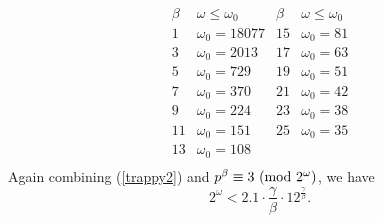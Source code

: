 \documentclass{amsart}
\def\mod#1{{\ifmmode\text{\rm\ (mod~$#1$)}
\else\discretionary{}{}{\hbox{ }}\rm(mod~$#1$)\fi}}
\begin{document}
{$$
\begin{array}{cc|cc}
\beta & \omega \leq \omega_0 & \beta & \omega \leq \omega_0 \\ \hline
1 & \omega_0=18077 & 15 & \omega_0=81 \\
3 &  \omega_0=2013 & 17 & \omega_0=63 \\
5 & \omega_0=729 & 19 & \omega_0=51 \\
7 & \omega_0=370 & 21 &  \omega_0=42 \\
9 & \omega_0=224 & 23 &  \omega_0=38 \\
11 & \omega_0=151 & 25 &  \omega_0=35 \\
13 &  \omega_0=108 & & \\
\end{array}
$$
Again combining  (\ref{trappy2}) and $p^\beta \equiv 3 \mod{2^\omega}$, we have
\begin{equation} \label{trappy3}
2^\omega < 2.1 \cdot \frac{\gamma}{\beta}  \cdot 12^{\frac{\gamma}{\beta}}.
\end{equation}


}
\end{document}
